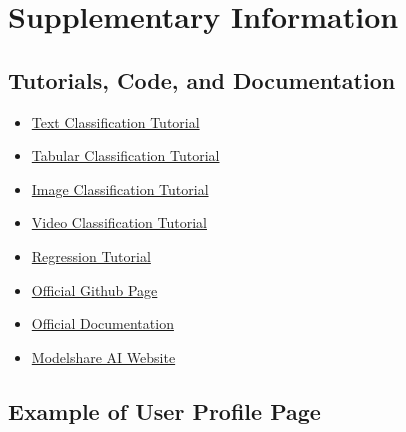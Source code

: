 \printbibliography
\newpage
\section*{Supplementary Information}
\appendix

\subsection{Tutorials, Code, and Documentation}
\label{app:tutorials}

\begin{itemize}

\item 
\href{https://colab.research.google.com/github/AIModelShare/aimodelshare_tutorials/blob/main/modelshareai/Text_Classification_QuickStart_IMDB.ipynb}{Text Classification Tutorial}

\item 
\href{https://colab.research.google.com/github/AIModelShare/aimodelshare_tutorials/blob/main/modelshareai/QST_Tabular_Classification.ipynb}{Tabular Classification Tutorial}

\item 
\href{https://colab.research.google.com/github/AIModelShare/aimodelshare_tutorials/blob/main/modelshareai/Keras_Image_Classification_Quick_Start_Tutorial.ipynb}{Image Classification Tutorial}

\item 
\href{https://colab.research.google.com/github/AIModelShare/aimodelshare_tutorials/blob/main/modelshareai/Keras_Video_Classification_Quick_Start_Tutorial(1).ipynb}{Video Classification Tutorial}

\item 
\href{https://www.modelshare.ai/notebooks/notebook:229}{Regression Tutorial}

\item 
\href{https://github.com/AIModelShare/aimodelshare}{Official Github Page}

\item 
\href{https://aimodelshare.readthedocs.io/en/latest/index.html}{Official Documentation}

\item 
\href{https://www.modelshare.ai/}{Modelshare AI Website}


\end{itemize}

\newpage
\subsection{Example of User Profile Page}
\label{app:profile_page}

